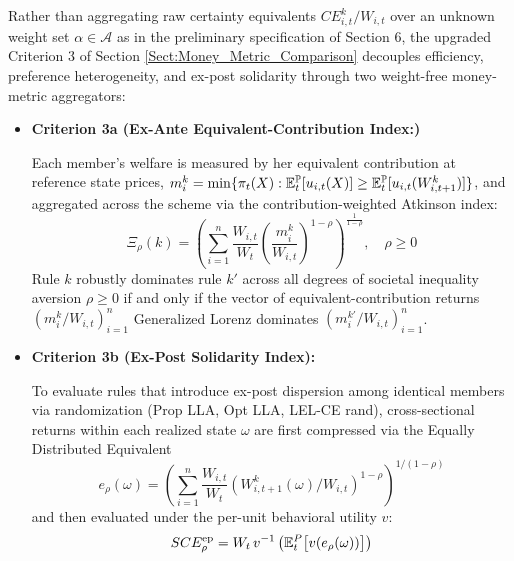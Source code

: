 \begin{enumerate}
    Rather than aggregating raw certainty equivalents $CE_{i,t}^k / W_{i,t}$ over an unknown weight set $\alpha \in \mathcal{A}$ as in the preliminary specification of Section 6, the upgraded Criterion 3 of Section \ref{Sect:Money_Metric_Comparison} decouples efficiency, preference heterogeneity, and ex-post solidarity through two weight-free money-metric aggregators:
    \begin{itemize}
        \item \textbf{Criterion 3a (Ex-Ante Equivalent-Contribution Index:)}
        
        Each member's welfare is measured by her equivalent contribution at reference state prices, $m_i^k = \min\{\pi_t(X) : \mathbb{E}_t^{\mathbb{P}}[u_{i,t}(X)] \geq \mathbb{E}_t^{\mathbb{P}}[u_{i,t}(W_{i,t+1}^k)]\}$, and aggregated across the scheme via the contribution-weighted Atkinson index:
        \begin{equation}
            \Xi_\rho(k) = \left( \sum_{i=1}^n \frac{W_{i,t}}{W_t} \left( \frac{m_i^k}{W_{i,t}} \right)^{1-\rho} \right)^{\frac{1}{1-\rho}}, \quad \rho \ge 0
        \end{equation}
        Rule $k$ robustly dominates rule $k'$ across all degrees of societal inequality aversion $\rho \ge 0$ if and only if the vector of equivalent-contribution returns $(m_i^k / W_{i,t})_{i=1}^n$ Generalized Lorenz dominates $(m_i^{k'} / W_{i,t})_{i=1}^n$.

        \item \textbf{Criterion 3b (Ex-Post Solidarity Index):}
        
        To evaluate rules that introduce ex-post dispersion among identical members via randomization (Prop LLA, Opt LLA, LEL-CE rand), cross-sectional returns within each realized state $\omega$ are first compressed via the Equally Distributed Equivalent
        \begin{equation*}
            e_\rho(\omega) = \left(\sum_{i=1}^n \frac{W_{i,t}}{W_t} (W_{i,t+1}^k(\omega)/W_{i,t})^{1-\rho}\right)^{1/(1-\rho)}
        \end{equation*}
        and then evaluated under the per-unit behavioral utility $v$:
        \begin{equation}
            SCE_\rho^{\text{ep}} = W_t \, v^{-1}\left( \mathbb{E}_t^{P}\big[ v(e_\rho(\omega)) \big] \right)
        \end{equation}
    \end{itemize}
\end{enumerate}

